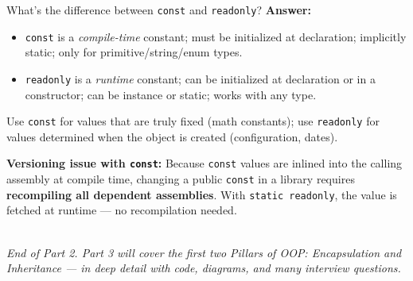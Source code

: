 \documentclass[11pt,a4paper]{article}
\begin{document}
\begin{intqBox}{What's the difference between \texttt{const} and \texttt{readonly}?}
\textbf{Answer:}
\begin{itemize}[leftmargin=*]
    \item \texttt{const} is a \textit{compile-time} constant; must be initialized at declaration; implicitly static; only for primitive/string/enum types.
    \item \texttt{readonly} is a \textit{runtime} constant; can be initialized at declaration or in a constructor; can be instance or static; works with any type.
\end{itemize}
Use \texttt{const} for values that are truly fixed (math constants); use \texttt{readonly} for values determined when the object is created (configuration, dates).
\end{intqBox}

\begin{gotchaBox}
\textbf{Versioning issue with \texttt{const}:} Because \texttt{const} values are inlined into the calling assembly at compile time, changing a public \texttt{const} in a library requires \textbf{recompiling all dependent assemblies}. With \texttt{static readonly}, the value is fetched at runtime — no recompilation needed.
\end{gotchaBox}

\vspace{0.5cm}
\noindent\hrulefill\\[-4pt]
\textit{\small End of Part 2. Part 3 will cover the first two Pillars of OOP: Encapsulation and Inheritance — in deep detail with code, diagrams, and many interview questions.}

\end{document}
